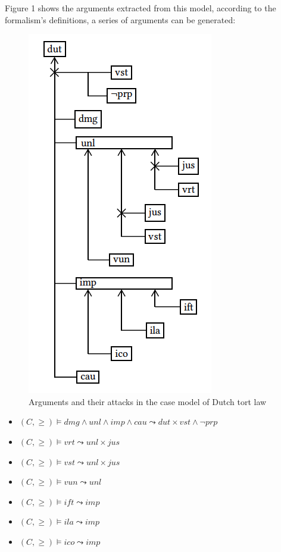 \documentclass{IOS-Book-Article}
\begin{document}
Figure 1 shows the arguments extracted from this model, according to the formalism's definitions, a series of arguments can be generated:

\begin{figure} [htbp]
\centering
\includegraphics [scale=0.3] {figure1.png}
\caption{Arguments and their attacks in the case model of Dutch tort law}
\end{figure}

\begin{itemize}
\item $(C, \geq) \vDash dmg \wedge unl \wedge imp \wedge cau \leadsto dut \times vst \wedge \neg prp$
\item $(C, \geq) \vDash vrt \leadsto unl \times jus$
\item $(C, \geq) \vDash vst \leadsto unl \times jus$
\item $(C, \geq) \vDash vun \leadsto unl$
\item $(C, \geq) \vDash ift \leadsto imp$
\item $(C, \geq) \vDash ila \leadsto imp$
\item $(C, \geq) \vDash ico \leadsto imp$
\end{itemize}
\end{document}

